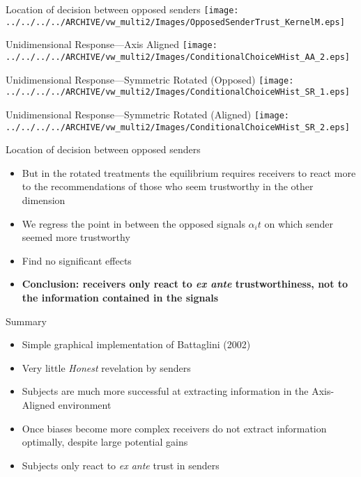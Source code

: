 \documentclass{beamer}
\begin{document}
\begin{frame}{Location of decision between opposed senders}
	\texttt{[image: ../../../../ARCHIVE/vw\_multi2/Images/OpposedSenderTrust\_KernelM.eps]}
\end{frame}

\begin{frame}{Unidimensional Response---Axis Aligned}
	\texttt{[image: ../../../../ARCHIVE/vw\_multi2/Images/ConditionalChoiceWHist\_AA\_2.eps]}
\end{frame}

\begin{frame}{Unidimensional Response---Symmetric Rotated (Opposed)}
	\texttt{[image: ../../../../ARCHIVE/vw\_multi2/Images/ConditionalChoiceWHist\_SR\_1.eps]}
\end{frame}
\begin{frame}{Unidimensional Response---Symmetric Rotated (Aligned)}
	\texttt{[image: ../../../../ARCHIVE/vw\_multi2/Images/ConditionalChoiceWHist\_SR\_2.eps]}
\end{frame}

\begin{frame}{Location of decision between opposed senders}
	\begin{itemize}
		\item But in the rotated treatments the equilibrium requires receivers to react more to the recommendations of those who seem trustworthy in the other dimension
		\item We regress the point in between the opposed signals $\alpha_it$ on which sender seemed more trustworthy
		\item Find no significant effects \pause
		\item {\bf Conclusion: receivers only react to \emph{ex ante} trustworthiness, not to the information contained in the signals}
	\end{itemize}
\end{frame}

\begin{frame}{Summary}
	\begin{itemize}
		\item Simple graphical implementation of Battaglini (2002)
		\item Very little \emph{Honest} revelation by senders
		\item Subjects are much more successful at extracting information in the Axis-Aligned environment
		\item Once biases become more complex receivers do not extract information optimally, despite large potential gains
		\item Subjects only react to \emph{ex ante} trust in senders
	\end{itemize}
\end{frame}

\end{document}
